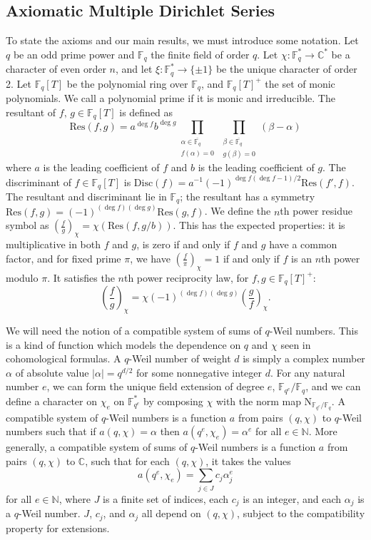 \documentclass[11pt,letterpaper]{article}
\theoremstyle{definition}
\theoremstyle{remark}
\numberwithin{equation}{section}
\theoremstyle{dotless}
\newcommand{\C}{\mathbb{C}}
\newcommand{\N}{\mathbb {N}}
\newcommand{\F}{\mathbb{F}}
\newcommand{\res}[2]{\left(\frac{#1}{#2}\right)}
\newcommand{\Res}{{\mathrm{Res}}}
\newcommand{\Disc}{{\mathrm{Disc}}}
\begin{document}
\subsection{Axiomatic Multiple Dirichlet Series}

To state the axioms and our main results, we must introduce some notation. Let $q$ be an odd prime power and $\F_q$ the finite field of order $q$. Let $\chi:\F_q^* \to \C^*$ be a character of even order $n$, and let $\xi:\F_q^* \to \{ \pm 1 \}$ be the unique character of order 2. Let $\F_q[T]$ be the polynomial ring over $\F_q$, and $\F_q[T]^+$ the set of monic polynomials. We call a polynomial prime if it is monic and irreducible. The resultant of $f, \, g \in \F_q[T]$ is defined as 
\begin{equation*}
\Res(f, g) = a^{\deg f} b^{\deg g} \prod_{\substack{ \alpha \in \overline{\F_q} \\ f(\alpha)=0}} \prod_{\substack{ \beta \in \overline{\F_q} \\ g(\beta)=0}} (\beta-\alpha)
\end{equation*}
where $a$ is the leading coefficient of $f$ and $b$ is the leading coefficient of $g$. The discriminant of $f \in \F_q[T]$ is $\Disc(f)=a^{-1}(-1)^{\deg f(\deg f - 1)/2}\Res(f', f)$. The resultant and discriminant lie in $\F_q$; the resultant has a symmetry $\Res(f, g) = (-1)^{(\deg f) (\deg g)} \Res(g, f)$. We define the $n$th power residue symbol as $\res{f}{g}_{\chi} = \chi(\Res(f,g/b))$. This has the expected properties: it is multiplicative in both $f$ and $g$, is zero if and only if $f$ and $g$ have a common factor, and for fixed prime $\pi$, we have $\res{f}{\pi}_\chi=1$ if and only if $f$ is an $n$th power modulo $\pi$. It satisfies the $n$th power reciprocity law, for $f, g \in \F_q[T]^+$:
\begin{equation*}
\res{f}{g}_{\chi} = \chi(-1)^{(\deg f)(\deg g)} \res{g}{f}_\chi .
\end{equation*}

We will need the notion of a compatible system of sums of $q$-Weil numbers. This is a kind of function which models the dependence on $q$ and $\chi$ seen in cohomological formulas. A $q$-Weil number of weight $d$ is simply a complex number $\alpha$ of absolute value $|\alpha|=q^{d/2}$ for some nonnegative integer $d$. For any natural number $e$, we can form the unique field extension of degree $e$, $\F_{q^e}/\F_q$, and we can define a character on $\chi_e$ on $\F_{q^e}^*$ by composing $\chi$ with the norm map $\mathrm{N}_{\F_{q^e}/\F_q}$. A compatible system of $q$-Weil numbers is a function $a$ from pairs $(q, \chi)$ to $q$-Weil numbers such that if $a(q, \chi)=\alpha$ then $a(q^e, \chi_e) = \alpha^e$ for all $e \in \N$. More generally, a compatible system of sums of $q$-Weil numbers is a function $a$ from pairs $(q, \chi)$ to $\C$, such that for each $(q, \chi)$, it takes the values
\begin{equation*}
a(q^e, \chi_e) = \sum_{j \in J} c_j \alpha_j^{e}
\end{equation*}
for all $e \in \N$, where $J$ is a finite set of indices, each $c_j$ is an integer, and each $\alpha_j$ is a $q$-Weil number. $J$, $c_j$, and $\alpha_j$ all depend on $(q, \chi)$, subject to the compatibility property for extensions.
\end{document}
